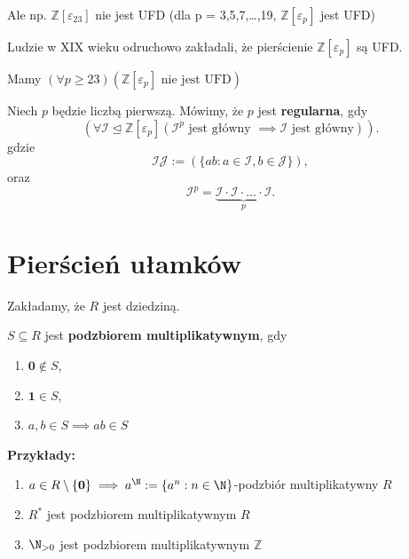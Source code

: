 Ale np. $\mathbb{Z} \left[ \varepsilon_{23} \right] $ nie jest UFD (dla p = 3,5,7,\ldots,19, $\mathbb{Z} \left[ \varepsilon_{p} \right] $ jest UFD)

Ludzie w XIX wieku odruchowo zakładali, że pierścienie $\mathbb{Z} \left[ \varepsilon _{p} \right] $ są UFD.


\begin{fact}
	Mamy
	$\left(\forall p \ge 23 \right)\left( \mathbb{Z} \left[ \varepsilon _{p} \right] \text{ nie jest UFD} \right)  $
\end{fact}
\begin{definition}
	Niech $p$ będzie liczbą pierwszą. Mówimy, że $p$ jest \textbf{regularna}, gdy
	\[
	\left(\forall \mathcal{I}\unlhd \mathbb{Z} \left[ \varepsilon_{p} \right] \left( \mathcal{I}^{p}\text{ jest główny } \implies \mathcal{I}\text{ jest główny} \right)  \right) 
	.\] 
	gdzie
	\[
		\mathcal{I}\mathcal{J} := \left(\{ab: a \in \mathcal{I}, b \in \mathcal{J}\} \right)
	,\]
	oraz
	\[
	\mathcal{I}^{p} = \underbrace{\mathcal{I}\cdot \mathcal{I} \cdot \ldots \cdot \mathcal{I}}_{p}
	.\] 
\end{definition} 
\section{Pierścień ułamków}
\begin{context}

	Zakładamy, że $R$ jest dziedziną.
\end{context}
\begin{definition}
	$S\subseteq R$ jest \textbf{podzbiorem multiplikatywnym}, gdy
	\begin{enumerate}[label=\arabic*)]
		\item $\mathbf{0} \not\in S$,
		\item $\mathbf{1} \in S$,
		\item $a,b \in S \implies ab \in S$
	\end{enumerate}
\end{definition} 
\noindent \textbf{Przykłady:}
\begin{enumerate}[label=\arabic*)]
	\item $a\in R\setminus \{\mathbf{0}\} \implies a^{\N}:= \{a^{n}: n\in \N\} $-podzbiór multiplikatywny $R$
	\item $R^{\ast} $ jest podzbiorem multiplikatywnym $R$ 
	\item $\N_{>0}$ jest podzbiorem multiplikatywnym $\mathbb{Z} $
\end{enumerate}

